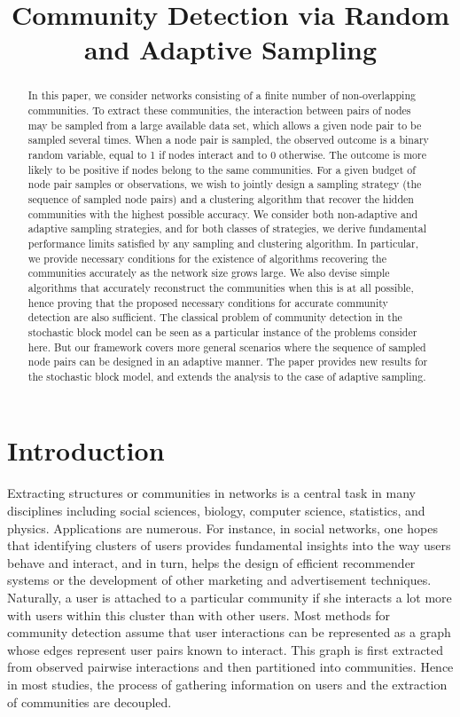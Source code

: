 \documentclass[12pt]{colt}%
\title[Community Detection via Adaptive Sampling]{Community Detection via Random and Adaptive Sampling}
\begin{document}
 

\maketitle

\begin{abstract}
In this paper, we consider networks consisting of a finite number of non-overlapping communities. To extract these communities, the interaction between pairs of nodes may be sampled from a large available data set, which allows a given node pair to be sampled several times. When a node pair is sampled, the observed outcome is a binary random variable, equal to 1 if nodes interact and to 0 otherwise. The outcome is more likely to be positive if nodes belong to the same communities. For a given budget of node pair samples or observations, we wish to jointly design a sampling strategy (the sequence of sampled node pairs) and a clustering algorithm that recover the hidden communities with the highest possible accuracy. We consider both non-adaptive and adaptive sampling strategies, and for both classes of strategies, we derive fundamental performance limits satisfied by any sampling and clustering algorithm. In particular, we provide necessary conditions for the existence of algorithms recovering the communities accurately as the network size grows large. We also devise simple algorithms that accurately reconstruct the communities when this is at all possible, hence proving that the proposed necessary conditions for accurate community detection are also sufficient. The classical problem of community detection in the stochastic block model can be seen as a particular instance of the problems consider here. But our framework covers more general scenarios where the sequence of sampled node pairs can be designed in an adaptive manner. The paper provides new results for the stochastic block model, and extends the analysis to the case of adaptive sampling.
\end{abstract}

\section{Introduction}\label{sec:introduction}

Extracting structures or communities in networks is a central task in many disciplines including social sciences, biology, computer science, statistics, and physics. Applications are numerous. For instance, in social networks, one hopes that identifying clusters of users provides fundamental insights into the way users behave and interact, and in turn, helps the design of efficient recommender systems or the development of other marketing and advertisement techniques. Naturally, a user is attached to a particular community if she interacts a lot more with users within this cluster than with other users. Most methods for community detection assume that user interactions can be represented as a graph whose edges represent user pairs known to interact. This graph is first extracted from observed pairwise interactions and then partitioned into communities. Hence in most studies, the process of gathering information on users and the extraction of communities are decoupled. 
\end{document}
